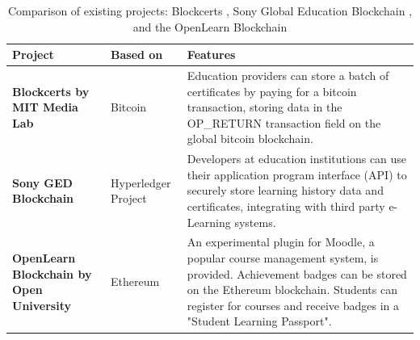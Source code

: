 \begin{table}[!ht]
	\caption[Comparison of existing projects: Blockcerts, Sony GED, and OpenLearn]
	{Comparison of existing projects: Blockcerts \citep{blockcerts2018}, Sony Global Education Blockchain \citep{sonyged2017}, and the OpenLearn Blockchain \citep{openlearn2018}}		 
	\centering
	\label{table:existingprojects}
	\begin{tabularx}{\textwidth}{|>{\bfseries}p{3.3cm}|p{2cm}|X|}
		\hline
		Project                                 & Based on            & Features                                                                                   \\
		\hline
		Blockcerts \newline by MIT Media Lab             & Bitcoin             & Education providers can store a batch of certificates by paying for a bitcoin transaction,
		storing data in the OP\_RETURN transaction field on the global bitcoin blockchain.                                                                         \\
		\hline
		Sony GED \newline Blockchain                     & Hyperledger \newline Project & Developers at education institutions can use their application program interface (API) to
		securely store learning history data and certificates, integrating with third party e-Learning systems.                                                    \\
		\hline
		OpenLearn \newline Blockchain \newline by Open University & Ethereum            & An experimental plugin for Moodle, a popular course management system, is provided. \newline 
		Achievement badges can be stored on the Ethereum blockchain. Students can register for courses and receive badges in a "Student Learning Passport".\\
		\hline
	\end{tabularx}
\end{table}



